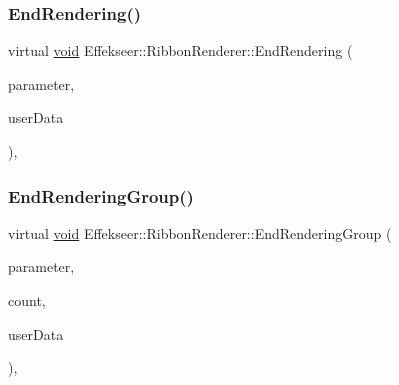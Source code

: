 \subsubsection{\texorpdfstring{End\+Rendering()}{EndRendering()}}
{\footnotesize\ttfamily virtual \mbox{\hyperlink{namespace_effekseer_ab34c4088e512200cf4c2716f168deb56}{void}} Effekseer\+::\+Ribbon\+Renderer\+::\+End\+Rendering (\begin{DoxyParamCaption}\item[{const \mbox{\hyperlink{struct_effekseer_1_1_ribbon_renderer_1_1_node_parameter}{Node\+Parameter}} \&}]{parameter,  }\item[{\mbox{\hyperlink{namespace_effekseer_ab34c4088e512200cf4c2716f168deb56}{void}} $\ast$}]{user\+Data }\end{DoxyParamCaption})\hspace{0.3cm}{\ttfamily [inline]}, {\ttfamily [virtual]}}

\mbox{\label{class_effekseer_1_1_ribbon_renderer_a9c86184fdf1123a6bdd557540c71ff5e}} 
\subsubsection{\texorpdfstring{End\+Rendering\+Group()}{EndRenderingGroup()}}
{\footnotesize\ttfamily virtual \mbox{\hyperlink{namespace_effekseer_ab34c4088e512200cf4c2716f168deb56}{void}} Effekseer\+::\+Ribbon\+Renderer\+::\+End\+Rendering\+Group (\begin{DoxyParamCaption}\item[{const \mbox{\hyperlink{struct_effekseer_1_1_ribbon_renderer_1_1_node_parameter}{Node\+Parameter}} \&}]{parameter,  }\item[{int32\+\_\+t}]{count,  }\item[{\mbox{\hyperlink{namespace_effekseer_ab34c4088e512200cf4c2716f168deb56}{void}} $\ast$}]{user\+Data }\end{DoxyParamCaption})\hspace{0.3cm}{\ttfamily [inline]}, {\ttfamily [virtual]}}

\mbox{\label{class_effekseer_1_1_ribbon_renderer_a3d1991348eeba97aa02c8082455edd39}} 
